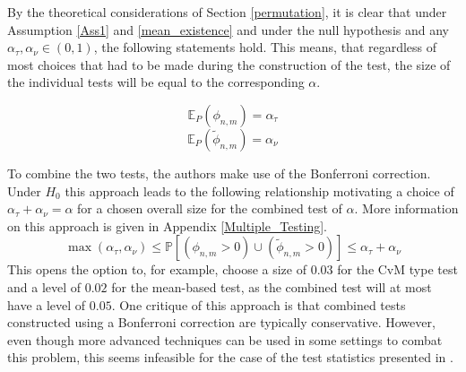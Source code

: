 \documentclass[12pt, a4paper]{article}
\theoremstyle{MAstyle} \newtheorem{assumption}{Assumption}[section]
\theoremstyle{MAstyle} \newtheorem{definition}{Definition}[section]
\theoremstyle{MAstyle} \newtheorem{theorem}{Theorem}[section]
\begin{document}
			By the theoretical considerations of Section \ref{permutation}, it is clear that under Assumption \ref{Ass1} and \ref{mean_existence} and under the null hypothesis and any $\alpha_{\tau}, \alpha_{\nu} \in (0,1)$, the following statements hold. This means, that regardless of most choices that had to be made during the construction of the test, the size of the individual tests will be equal to the corresponding $\alpha$.
			\begin{multicols}{2}
				\noindent
				\begin{equation*}
					\mathbb{E}_P\left(\phi_{n,m}\right) = \alpha_{\tau}
				\end{equation*}			
				\begin{equation}
					\mathbb{E}_P\left(\tilde{\phi}_{n,m}\right) = \alpha_{\nu}
				\end{equation}
			\end{multicols}
			
			To combine the two tests, the authors make use of the Bonferroni correction. Under $H_0$ this approach leads to the following relationship motivating a choice of $\alpha_{\tau} + \alpha_{\nu} = \alpha$ for a chosen overall size for the combined test of $\alpha$. More information on this approach is given in Appendix \ref{Multiple_Testing}.
			\begin{equation}
				\max(\alpha_{\tau}, \alpha_{\nu}) \leq \mathbb{P}\left[(\phi_{n,m} > 0) \cup (\tilde{\phi}_{n,m} > 0)\right] \leq \alpha_{\tau} + \alpha_{\nu}
			\end{equation}
			This opens the option to, for example, choose a size of $0.03$ for the CvM type test and a level of $0.02$ for the mean-based test, as the combined test will at most have a level of $0.05$. One critique of this approach is that combined tests constructed using a Bonferroni correction are typically conservative. However, even though more advanced techniques can be used in some settings to combat this problem, this seems infeasible for the case of the test statistics presented in \cite{bugni_permutation_2021}.
			
		\newpage
\end{document}
